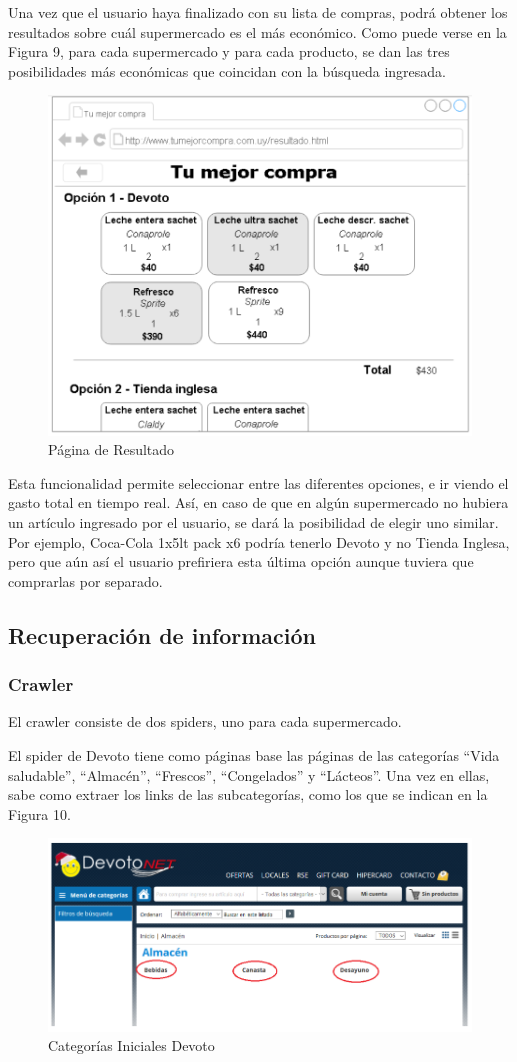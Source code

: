 \documentclass[12pt]{article} %
\begin{document}
Una vez que el usuario haya finalizado con su lista de compras, podrá obtener los resultados sobre cuál supermercado es el más económico. Como puede verse en la Figura 9, para cada supermercado y para cada producto, se dan las tres posibilidades más económicas que coincidan con la búsqueda ingresada.

\begin{figure}[H]
\includegraphics[height=0.30\textwidth]{pag_resultado}
\centering
\caption{Página de Resultado}
\end{figure}

Esta funcionalidad permite seleccionar entre las diferentes opciones, e ir viendo el gasto total en tiempo real. Así, en caso de que en algún supermercado no hubiera un artículo ingresado por el usuario, se dará la posibilidad de elegir uno similar. Por ejemplo, Coca-Cola 1x5lt pack x6 podría tenerlo Devoto y no Tienda Inglesa, pero que aún así el usuario prefiriera esta última opción aunque tuviera que comprarlas por separado.


\subsection{Recuperación de información}

\subsubsection{Crawler}

El crawler consiste de dos spiders, uno para cada supermercado.

El spider de Devoto \cite{Devoto} tiene como páginas base las páginas de las categorías “Vida saludable”, “Almacén”, “Frescos”, “Congelados” y “Lácteos”. Una vez en ellas, sabe como extraer los links de las subcategorías, como los que se indican en la Figura 10.

\begin{figure}[H]
\includegraphics[height=0.30\textwidth]{pag_devoto}
\centering
\caption{Categorías Iniciales Devoto}
\end{figure}
\end{document}
